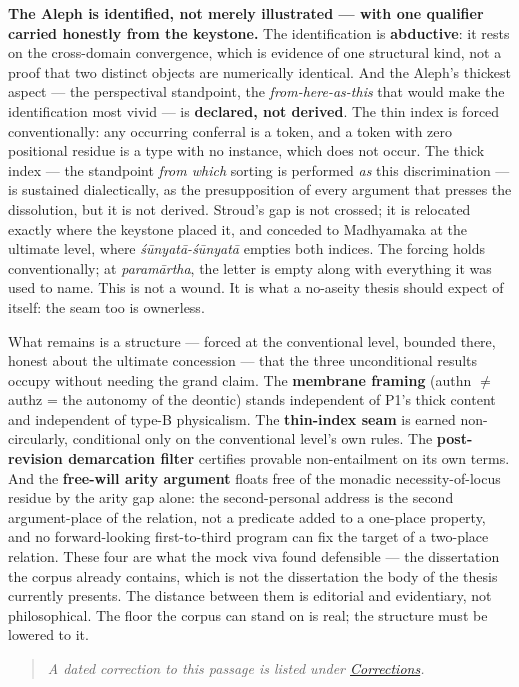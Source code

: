 \documentclass[11pt]{article}
\begin{document}
\textbf{The Aleph is identified, not merely illustrated — with one qualifier carried honestly from the keystone.} The identification is \textbf{abductive}: it rests on the cross-domain convergence, which is evidence of one structural kind, not a proof that two distinct objects are numerically identical. And the Aleph's thickest aspect — the perspectival standpoint, the \emph{from-here-as-this} that would make the identification most vivid — is \textbf{declared, not derived}. The thin index is forced conventionally: any occurring conferral is a token, and a token with zero positional residue is a type with no instance, which does not occur. The thick index — the standpoint \emph{from which} sorting is performed \emph{as} this discrimination — is sustained dialectically, as the presupposition of every argument that presses the dissolution, but it is not derived. Stroud's gap is not crossed; it is relocated exactly where the keystone placed it, and conceded to Madhyamaka at the ultimate level, where \emph{śūnyatā-śūnyatā} empties both indices. The forcing holds conventionally; at \emph{paramārtha}, the letter is empty along with everything it was used to name. This is not a wound. It is what a no-aseity thesis should expect of itself: the seam too is ownerless.

What remains is a structure — forced at the conventional level, bounded there, honest about the ultimate concession — that the three unconditional results occupy without needing the grand claim. The \textbf{membrane framing} (authn \ensuremath{\neq} authz = the autonomy of the deontic) stands independent of P1's thick content and independent of type-B physicalism. The \textbf{thin-index seam} is earned non-circularly, conditional only on the conventional level's own rules. The \textbf{post-revision demarcation filter} certifies provable non-entailment on its own terms. And the \textbf{free-will arity argument} floats free of the monadic necessity-of-locus residue by the arity gap alone: the second-personal address is the second argument-place of the relation, not a predicate added to a one-place property, and no forward-looking first-to-third program can fix the target of a two-place relation. These four are what the mock viva found defensible — the dissertation the corpus already contains, which is not the dissertation the body of the thesis currently presents. The distance between them is editorial and evidentiary, not philosophical. The floor the corpus can stand on is real; the structure must be lowered to it.

\begin{quote}\small\emph{A dated correction to this passage is listed under \hyperref[corrections]{Corrections}.}\end{quote}
\end{document}
